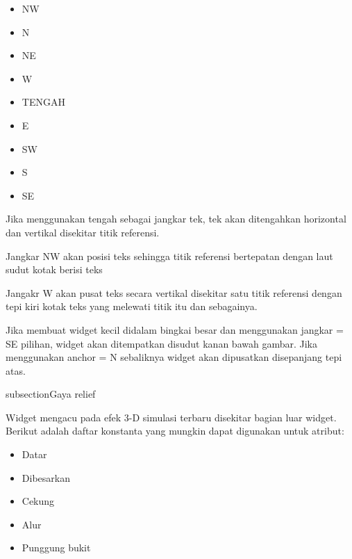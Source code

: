 \documentclass [12pt,a4paper,notitlepage,oneside,bahasa]{article}
\begin{document}
\begin{enumerate}
\begin{itemize}
\begin{itemize}
\begin{itemize}
		\item NW  
		\item N
		\item NE
		\item W
		\item TENGAH
		\item E
		\item SW
		\item S
		\item SE
	\end{itemize}
\end{itemize}
 \par
\vspace{12pt}
Jika menggunakan tengah sebagai jangkar tek, tek akan ditengahkan horizontal dan vertikal disekitar titik referensi. \par
Jangkar NW akan posisi teks sehingga titik referensi bertepatan dengan laut sudut kotak berisi teks \par
Jangakr W akan pusat teks secara vertikal disekitar satu titik referensi dengan tepi kiri kotak teks yang melewati titik itu dan sebagainya. \par
Jika membuat widget kecil didalam bingkai besar dan menggunakan jangkar = SE pilihan, widget akan ditempatkan disudut kanan bawah gambar. Jika menggunakan anchor = N sebaliknya widget akan dipusatkan disepanjang tepi atas. \par
\noindent 

subsection{Gaya relief}

Widget mengacu pada efek 3-D simulasi terbaru disekitar bagian luar widget. Berikut adalah daftar konstanta yang mungkin dapat digunakan untuk atribut:
\begin{itemize}
	\item Datar
	\item Dibesarkan
	\item Cekung
	\item Alur
	\item Punggung bukit
\end{itemize}



\end{itemize}
\end{enumerate}
\end{document}
